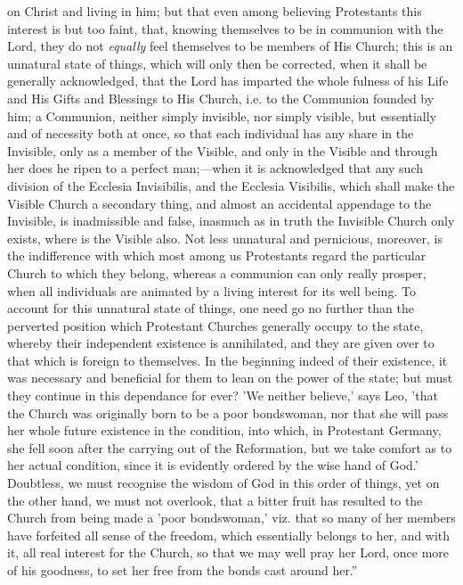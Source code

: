 on Christ and living in him; but that even among believing Protestants
this interest is but too faint, that, knowing themselves to be in
communion with the Lord, they do not \emph{equally} feel themselves to
be members of His Church; this is an unnatural state of things, which
will only then be corrected, when it shall be generally acknowledged,
that the Lord has imparted the whole fulness of his Life and His Gifts
and Blessings to His Church, i.e. to the Communion founded by him; a
Communion, neither simply invisible, nor simply visible, but essentially
and of necessity both at once, so that each individual has any share in
the Invisible, only as a member of the Visible, and only in the Visible
and through her does he ripen to a perfect man;—when it is
acknowledged that any such division of the Ecclesia Invisibilis, and the
Ecclesia Visibilis, which shall make the Visible Church a secondary
thing, and almost an accidental appendage to the Invisible, is
inadmissible and false, inasmuch as in truth the Invisible Church only
exists, where is the Visible also. Not less unnatural and pernicious,
moreover, is the indifference with which most among us Protestants
regard the particular Church to which they belong, whereas a communion
can only really prosper, when all individuals are animated by a living
interest for its well being. To account for this unnatural state of
things, one need go no further than the perverted position which
Protestant Churches generally occupy to the state, whereby their
independent existence is annihilated, and they are given over to that
which is foreign to themselves. In the beginning indeed of their
existence, it was necessary and beneficial for them to lean on the power
of the state; but must they continue in this dependance for ever? 'We
neither believe,' says Leo, 'that the Church was originally born to be a
poor bondswoman, nor that she will pass her whole future existence in
the condition, into which, in Protestant Germany, she fell soon after
the carrying out of the Reformation, but we take comfort as to her
actual condition, since it is evidently ordered by the wise hand of God.'
Doubtless, we must recognise the wisdom of God in this order of things,
yet on the other hand, we must not overlook, that a bitter fruit has
resulted to the Church from being made a 'poor bondswoman,' viz. that so
many of her members have forfeited all sense of the freedom, which
essentially belongs to her, and with it, all real interest for the
Church, so that we may well pray her Lord, once more of his goodness, to
set her free from the bonds cast around her.''

